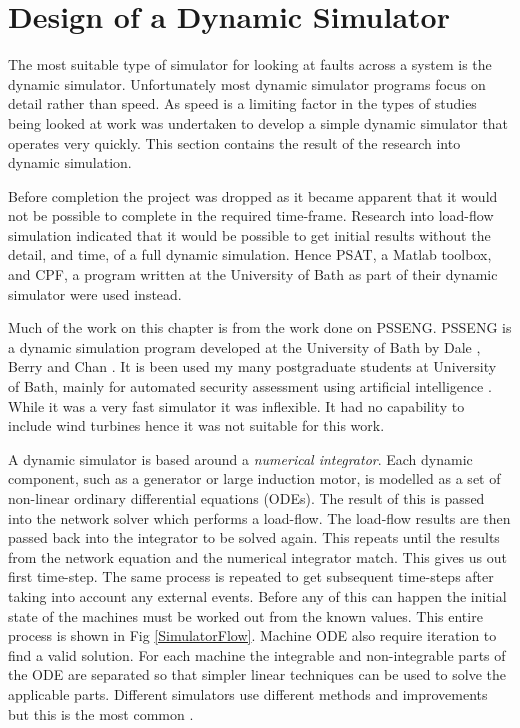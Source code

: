\documentclass[a4paper,oneside,12pt]{report}
\begin{document}
\section{Design of a Dynamic Simulator} \label{sec_dynamic_sim}

The most suitable type of simulator for looking at faults across a system is the dynamic simulator. Unfortunately most dynamic simulator programs focus on detail rather than speed. As speed is a limiting factor in the types of studies being looked at work was undertaken to develop a simple dynamic simulator that operates very quickly. This section contains the result of the research into dynamic simulation.

Before completion the project was dropped as it became apparent that it would not be possible to complete in the required time-frame. Research into load-flow simulation indicated that it would be possible to get initial results without the detail, and time, of a full dynamic simulation. Hence PSAT, a Matlab toolbox, and CPF, a program written at the University of Bath as part of their dynamic simulator were used instead.

Much of the work on this chapter is from the work done on PSSENG. PSSENG is a dynamic simulation program developed at the University of Bath by Dale \cite{Dale1986}, Berry \cite{Berry1989} and Chan \cite{Chan1992}. It is been used my many postgraduate students at University of Bath, mainly for automated security assessment using artificial intelligence \cite{Edwards1995, Nicholson1998, Zhang2007, Bell1995}. While it was a very fast simulator it was inflexible. It had no capability to include wind turbines hence it was not suitable for this work.

A dynamic simulator is based around a \emph{numerical integrator}. Each dynamic component, such as a generator or large induction motor, is modelled as a set of non-linear ordinary differential equations (ODEs). The result of this is passed into the network solver which performs a load-flow. The load-flow results are then passed back into the integrator to be solved again. This repeats until the results from the network equation and the numerical integrator match. This gives us out first time-step. The same process is repeated to get subsequent time-steps after taking into account any external events. Before any of this can happen the initial state of the machines must be worked out from the known values. This entire process is shown in Fig \ref{SimulatorFlow}. Machine ODE also require iteration to find a valid solution. For each machine the integrable and non-integrable parts of the ODE are separated so that simpler linear techniques can be used to solve the applicable parts. Different simulators use different methods and improvements but this is the most common \cite{Siemens, Milano}.
\end{document}
